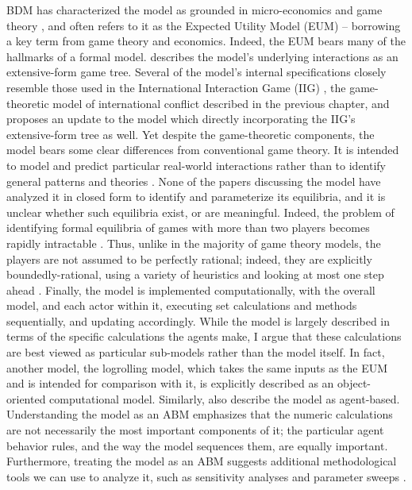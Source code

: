 BDM has characterized the model as grounded in micro-economics \citep{bdm_1994} and game theory \citep{bdm_2002,bdm_2009,bdm_2010}, and often refers to it as the Expected Utility Model (EUM) \citep{bdm_1984} -- borrowing a key term from game theory and economics. Indeed, the EUM bears many of the hallmarks of a formal model. \citet{scholz_2011} describes the model's underlying interactions as an extensive-form game tree. Several of the model's internal specifications closely resemble those used in the International Interaction Game (IIG) \citep{bdm_1992}, the game-theoretic model of international conflict described in the previous chapter, and \citet{bdm_2011} proposes an update to the model which directly incorporating the IIG's extensive-form tree as well. Yet despite the game-theoretic components, the model bears some clear differences from conventional game theory. It is intended to model and predict particular real-world interactions rather than to identify general patterns and theories \citep{snidal_1985}. None of the papers discussing the model have analyzed it in closed form to identify and parameterize its equilibria, and it is unclear whether such equilibria exist, or are meaningful. Indeed, the problem of identifying formal equilibria of games with more than two players becomes rapidly intractable \citep{papadimitriou_2005}. Thus, unlike in the majority of game theory models, the players are not assumed to be perfectly rational; indeed, they are explicitly boundedly-rational, using a variety of heuristics and looking at most one step ahead \citep{bdm_2002}. Finally, the model is implemented computationally, with the overall model, and each actor within it, executing set calculations and methods sequentially, and updating accordingly. While the model is largely described in terms of the specific calculations the agents make, I argue that these calculations are best viewed as particular sub-models rather than the model itself. In fact, another model, the \citet{stokman_1994} logrolling model, which takes the same inputs as the EUM and is intended for comparison with it, is explicitly described as an object-oriented computational model. Similarly, \citet{root_2013} also describe the model as agent-based. Understanding the model as an ABM emphasizes that the numeric calculations are not necessarily the most important components of it; the particular agent behavior rules, and the way the model sequences them, are equally important. Furthermore, treating the model as an ABM suggests additional methodological tools we can use to analyze it, such as sensitivity analyses and parameter sweeps \citep{gilbert_2005}.

